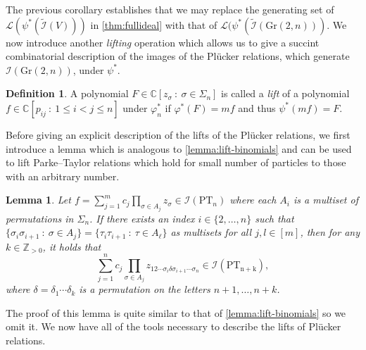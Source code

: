 \documentclass[12pt, reqno]{amsart}
\numberwithin{equation}{section}
\theoremstyle{plain}
\newtheorem{lemma}[theorem]{Lemma}
\theoremstyle{definition}
\newtheorem{definition}[theorem]{Definition}
\newcommand{\cc}{\mathbb{C}}
\newcommand{\zz}{\mathbb{Z}}
\newcommand{\ci}{\mathcal{I}}
\newcommand{\gr}{\mathrm{Gr}}
\begin{document}
The previous corollary establishes that we may replace the generating set of $\mathcal{L}(\psi^\ast(\tilde{\ci}(V)))$ in \cref{thm:fullideal} with that of $\mathcal{L}(\psi^\ast(\tilde{\ci}(\gr(2,n)))$. We now introduce another \emph{lifting} operation which allows us to give a succint combinatorial description of the images of the Pl\"ucker relations, which generate $\ci(\gr(2, n))$, under $\psi^\ast$. 

\begin{definition}
A polynomial $F \in \cc[z_\sigma ~:~ \sigma \in \Sigma_n]$ is called a \emph{lift} of a polynomial $f \in \cc[p_{ij} ~:~ 1 \leq i < j \leq n]$ under $\varphi_n^\ast$ if $\varphi^\ast(F) = m f $ and thus $\psi^\ast(mf) = F$. 
\end{definition}

Before giving an explicit description of the lifts of the Pl\"ucker relations, we first introduce a lemma which is analogous to \cref{lemma:lift-binomials} and can be used to lift Parke--Taylor relations which hold for small number of particles to those with an arbitrary number. 

\begin{lemma}
\label{lemma:small-plucker-to-big}
Let $f = \sum_{j = 1}^m c_j \prod_{\sigma \in A_j } z_\sigma \in \ci(\mathrm{PT}_n)$ where each $A_i$ is a multiset of permutations in $\Sigma_n$. If there exists an index $i \in \{2,\ldots, n\}$ such that $\{\sigma_i \sigma_{i+1} ~:~ \sigma \in A_j \} = \{\tau_i \tau_{i+1} ~:~ \tau \in A_\ell \}$ as multisets for all $j, l \in [m]$, then for any $k \in \zz_{>0}$, it holds that
\[
\sum \limits_{j = 1}^n c_j \prod_{\sigma \in A_j} z_{1 2 \cdots \sigma_i \delta \sigma_{i+1} \cdots \sigma_n} \in \ci(\mathrm{PT_{n+k}}),
\]
where $\delta = \delta_1 \cdots \delta_k$ is a permutation on the letters $n+1, \ldots, n+k$. 
\end{lemma}

The proof of this lemma is quite similar to that of \cref{lemma:lift-binomials} so we omit it. We now have all of the tools necessary to describe the lifts of Pl\"ucker relations. 
\end{document}
